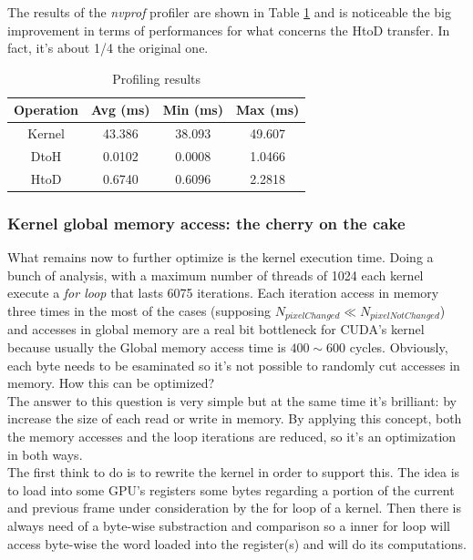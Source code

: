 \documentclass[paper=a4, fontsize=10pt]{scrartcl}	%
\begin{document}
	The results of the \textit{nvprof} profiler are shown in Table \ref{tab:nvprof_naif3} and is noticeable the big improvement in terms of performances for what concerns the HtoD transfer. In fact, it's about 1/4 the original one.

	\begin{table}[H]
		\centering
		\begin{tabular}{||c | c c c||} 
			\hline
			Operation & Avg (ms) & Min (ms) & Max (ms) \\ [0.5ex] 
			\hline\hline
			Kernel & 43.386 & 38.093 & 49.607 \\ 
			\hdashline
			DtoH & 0.0102 & 0.0008 & 1.0466 \\
			\hdashline
			HtoD & 0.6740 & 0.6096 & 2.2818 \\
			\hline
		\end{tabular}
		\caption{Profiling results}
		\label{tab:nvprof_naif3}
	\end{table}

	\subsubsection{Kernel global memory access: the cherry on the cake}
	\label{sec:cherry}

	What remains now to further optimize is the kernel execution time. Doing a bunch of analysis, with a maximum number of threads of 1024 each kernel execute a \textit{for loop} that lasts 6075 iterations. Each iteration access in memory three times in the most of the cases (supposing $ N_{pixelChanged} \ll N_{pixelNotChanged} $) and accesses in global memory are a real bit bottleneck for CUDA's kernel because usually the Global memory access time is $400 \sim 600$ cycles. Obviously, each byte needs to be esaminated so it's not possible to randomly cut accesses in memory. How this can be optimized?\\

	The answer to this question is very simple but at the same time it's brilliant: by increase the size of each read or write in memory. By applying this concept, both the memory accesses and the loop iterations are reduced, so it's an optimization in both ways.\\

	The first think to do is to rewrite the kernel in order to support this. The idea is to load into some GPU's registers some bytes regarding a portion of the current and previous frame under consideration by the for loop of a kernel. Then there is always need of a byte-wise substraction and comparison so a inner for loop will access byte-wise the word loaded into the register(s) and will do its computations.\\
\end{document}
